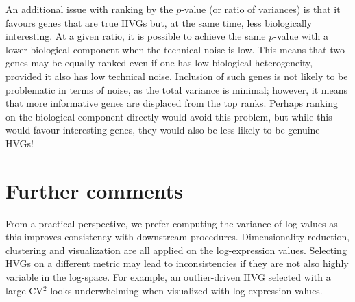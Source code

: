 \documentclass{article}
\begin{document}
An additional issue with ranking by the $p$-value (or ratio of variances) is that it favours genes that are true HVGs but, at the same time, less biologically interesting.
At a given ratio, it is possible to achieve the same $p$-value with a lower biological component when the technical noise is low.
This means that two genes may be equally ranked even if one has low biological heterogeneity, provided it also has low technical noise.
Inclusion of such genes is not likely to be problematic in terms of noise, as the total variance is minimal;
however, it means that more informative genes are displaced from the top ranks.
Perhaps ranking on the biological component directly would avoid this problem, but while this would favour interesting genes, they would also be less likely to be genuine HVGs!

\section{Further comments}
From a practical perspective, we prefer computing the variance of log-values as this improves consistency with downstream procedures.
Dimensionality reduction, clustering and visualization are all applied on the log-expression values.
Selecting HVGs on a different metric may lead to inconsistencies if they are not also highly variable in the log-space.
For example, an outlier-driven HVG selected with a large CV$^2$ looks underwhelming when visualized with log-expression values.
\end{document}
